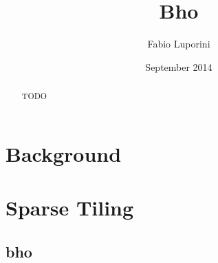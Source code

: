 


\title{Bho}
\author{Fabio Luporini}
\date{September 2014}
\dedication{}



\maketitle


\begin{abstract}

TODO

\end{abstract}


\makededication

\tableofcontents
\listoftables
\listoffigures

\mainmatter




\chapter{Background}




\chapter{Sparse Tiling}

\section{bho}

